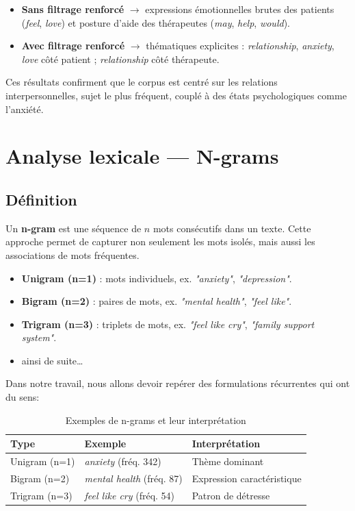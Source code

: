 \documentclass[12pt,a4paper]{report}
\begin{document}
\begin{itemize}
  \item \textbf{Sans filtrage renforcé} $\rightarrow$ expressions émotionnelles brutes des patients (\textit{feel}, \textit{love}) et posture d'aide des thérapeutes (\textit{may}, \textit{help}, \textit{would}).
  \item \textbf{Avec filtrage renforcé} $\rightarrow$ thématiques explicites : \textit{relationship}, \textit{anxiety}, \textit{love} côté patient ; \textit{relationship} côté thérapeute.
\end{itemize}

\begin{note}[Remarque]
Ces résultats confirment que le corpus est centré sur les relations interpersonnelles, sujet le plus fréquent, couplé à des états psychologiques comme l'anxiété.
\end{note}

\section{Analyse lexicale — N-grams}

\subsection{Définition}

Un \textbf{n-gram} est une séquence de $n$ mots consécutifs dans un texte. Cette approche
permet de capturer non seulement les mots isolés, mais aussi les associations de mots fréquentes.
\begin{itemize}
  \item \textbf{Unigram (n=1)} : mots individuels, ex. \textit{"anxiety"}, \textit{"depression"}.
  \item \textbf{Bigram (n=2)} : paires de mots, ex. \textit{"mental health"}, \textit{"feel like"}.
  \item \textbf{Trigram (n=3)} : triplets de mots, ex. \textit{"feel like cry"}, \textit{"family support system"}.
  \item ainsi de suite\dots
\end{itemize}
\vspace{1px}

Dans notre travail, nous allons devoir repérer des formulations récurrentes qui ont du sens:

\begin{table}[h]
\centering
\begin{tabularx}{\textwidth}{lXX}
\toprule
\textbf{Type} & \textbf{Exemple} & \textbf{Interprétation} \\
\midrule
Unigram (n=1) & \textit{anxiety} (fréq. 342) & Thème dominant \\
Bigram  (n=2) & \textit{mental health} (fréq. 87) & Expression caractéristique \\
Trigram (n=3) & \textit{feel like cry} (fréq. 54) & Patron de détresse \\
\bottomrule
\end{tabularx}
\caption{Exemples de n-grams et leur interprétation}
\end{table}
\end{document}
